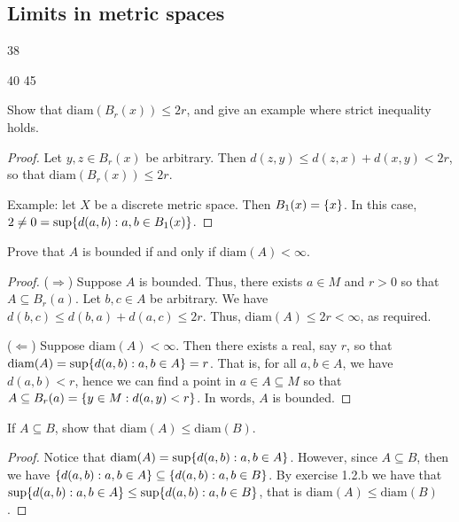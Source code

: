 \subsection{Limits in metric spaces}

38

40
45

\begin{exercise}{27}
Show that $\text{diam}(B_r(x))\leq 2r$, and give an example where strict inequality holds.
\end{exercise}
\begin{proof}
Let $y,z\in B_r(x)$ be arbitrary. Then $d(z,y)\leq d(z,x)+d(x,y)<2r$, so that $\text{diam}(B_r(x))\leq 2r$. 

Example: let $X$ be a discrete metric space. Then $B_1(x)=\{x\}$. In this case, $2\neq 0=\sup\{d(a,b):a,b\in B_1(x)\}$.
\end{proof} 

\begin{exercise}{29}
Prove that $A$ is bounded if and only if $\text{diam}(A)<\infty$.
\end{exercise}
\begin{proof}
($\Rightarrow$) Suppose $A$ is bounded. Thus, there exists $a\in M$ and $r>0$ so that $A\subseteq B_r(a)$. Let $b,c\in A$ be arbitrary. We have $d(b,c)\leq d(b,a)+d(a,c)\leq 2r$. Thus, $\text{diam}(A)\leq 2r<\infty$, as required.

($\Leftarrow$) Suppose $\text{diam}(A)<\infty$. Then there exists a real, say $r$, so that $\text{diam}(A) =\sup\{d(a,b):a,b\in A\} =r$. That is, for all $a,b\in A$, we have $d(a,b)<r$, hence we can find a point in $a\in A\subseteq M$ so that $A\subseteq B_r(a)=\{y\in M:d(a,y)<r\}$. In words, $A$ is bounded.
\end{proof} 

\begin{exercise}{30}
If $A\subseteq B$, show that $\text{diam}(A)\leq\text{diam}(B)$.
\end{exercise}
\begin{proof}
Notice that $\text{diam}(A) =\sup\{d(a,b):a,b\in A\}$. However, since $A\subseteq B$, then we have $\{d(a,b):a,b\in A\} \subseteq\{d(a,b):a,b\in B\}$. By exercise 1.2.b we have that $\sup\{d(a,b):a,b\in A\} \leq\sup\{d(a,b):a,b\in B\}$, that is $\text{diam}(A) \leq\text{diam}(B)$.
\end{proof} 

